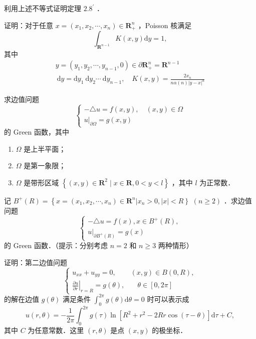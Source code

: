 \documentclass{mynote}
\begin{document}
\begin{exercise}    
    利用上述不等式证明定理 $2.8^{\prime}$ ．
\end{exercise}

\begin{exercise}
    证明：对于任意 $x=\left(x_1, x_2, \cdots, x_n\right) \in \mathbf{R}_{+}^n$ ，Poisson 核满足
$$
\int_{\mathbf{R}^{n-1}} K(x, y) \mathrm{d} y=1,
$$
其中
$$
\begin{gathered}
y=\left(y_1, y_2, \cdots, y_{n-1}, 0\right) \in \partial \mathbf{R}_{+}^n=\mathbf{R}^{n-1} \\
\mathrm{~d} y=\mathrm{d} y_1 \mathrm{~d} y_2 \cdots \mathrm{~d} y_{n-1}, \quad K(x, y)=\frac{2 x_n}{n \alpha(n)|y-x|^n}
\end{gathered}
$$
\end{exercise}

\begin{exercise}
    求边值问题
$$
\left\{\begin{array}{l}
-\triangle u=f(x, y), \quad(x, y) \in \Omega \\
\left.u\right|_{\partial \Omega}=g(x, y)
\end{array}\right.
$$
的 Green 函数，其中
\begin{enumerate}
    \item $\Omega$ 是上半平面；
    \item $\Omega$ 是第一象限；
    \item $\Omega$ 是带形区域 $\left\{(x, y) \in \mathbf{R}^2 \mid x \in \mathbf{R}, 0<y<l\right\}$ ，其中 $l$ 为正常数．
\end{enumerate}
\end{exercise}


\begin{exercise}
    记 $B^{+}(R)=\left\{x=\left(x_1, x_2, \cdots, x_n\right) \in \mathbf{R}^n\left|x_n>0,|x|<R\right\}\right.$ $(n \geq 2)$ ．求边值问题
$$
\left\{\begin{array}{l}
-\triangle u=f(x), x \in B^{+}(R), \\
\left.u\right|_{\partial B^{+}(R)}=g(x)
\end{array}\right.
$$
的 Green 函数．（提示：分别考虑 $n=2$ 和 $n \geq 3$ 两种情形）
\end{exercise}

\begin{exercise}
    证明：第二边值问题
$$
\begin{cases}u_{x x}+u_{y y}=0, & (x, y) \in B(0, R), \\ \left.\frac{\partial u}{\partial r}\right|_{r=R}=g(\theta), & \quad \theta \in[0,2 \pi]\end{cases}
$$
的解在边值 $g(\theta)$ 满足条件 $\int_0^{2 \pi} g(\theta) \mathrm{d} \theta=0$ 时可以表示成
$$
u(r, \theta)=-\frac{1}{2 \pi} \int_0^{2 \pi} g(\tau) \ln \left[R^2+r^2-2 R r \cos (\tau-\theta)\right] \mathrm{d} \tau+C,
$$
其中 $C$ 为任意常数．这里 $(r, \theta)$ 是点 $(x, y)$ 的极坐标．
\end{exercise}
\end{document}
